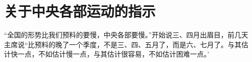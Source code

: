 \section[关于中央各部运动的指示（一九六七年六月）]{关于中央各部运动的指示}


“全国的形势比我们预料的要慢，中央各部要慢。”开始说三、四月出眉目，前几天主席说“比预料的晚了一个季度，不是三、四、五月了，而是六、七月了。与其估计快一点，不如估计慢一点，与其估计很容易，不如估计困难一点。’



